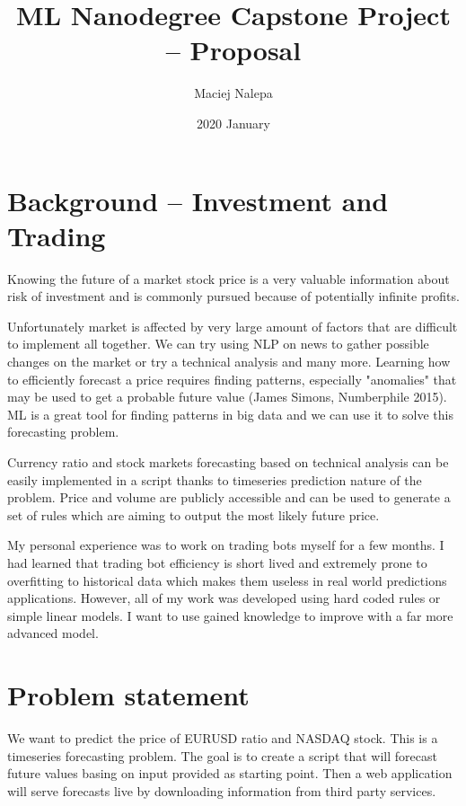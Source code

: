 \documentclass[a4paper,12pt]{article}
\title{ML Nanodegree Capstone Project -- Proposal}
\author{Maciej Nalepa}
\date{2020 January}
\begin{document}
\maketitle

\section{Background -- Investment and Trading}
Knowing the future of a market stock price is a very valuable information about risk of investment and is commonly pursued because of potentially infinite profits.

Unfortunately market is affected by very large amount of factors that are difficult to implement all together. We can try using NLP on news to gather possible changes on the market or try a technical analysis and many more. Learning how to efficiently forecast a price requires finding patterns, especially "anomalies" that may be used to get a probable future value (James Simons, Numberphile 2015). ML is a great tool for finding patterns in big data and we can use it to solve this forecasting problem.

Currency ratio and stock markets forecasting based on technical analysis can be easily implemented in a script thanks to timeseries prediction nature of the problem. Price and volume are publicly accessible and can be used to generate a set of rules which are aiming to output the most likely future price.

My personal experience was to work on trading bots myself for a few months. I had learned that trading bot efficiency is short lived and extremely prone to overfitting to historical data which makes them useless in real world predictions applications. However, all of my work was developed using hard coded rules or simple linear models. I want to use gained knowledge to improve with a far more advanced model.

\section{Problem statement}
We want to predict the price of EURUSD ratio and NASDAQ stock. This is a timeseries forecasting problem. The goal is to create a script that will forecast future values basing on input provided as starting point. Then a web application will serve forecasts live by downloading information from third party services.
\end{document}
